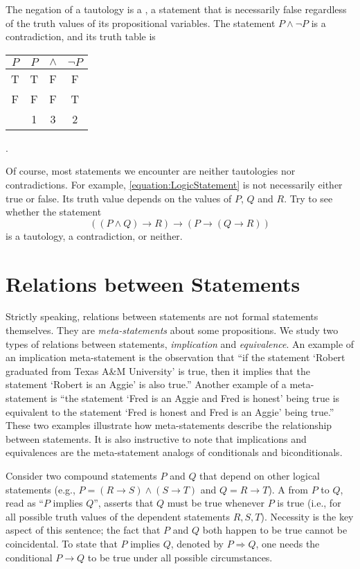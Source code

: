 The negation of a tautology is a , a statement that is necessarily false regardless of the truth values of its propositional variables.
The statement $P \wedge \neg P$ is a contradiction, and its truth table is
\begin{center}
\begin{tabular}{|c|ccc|}
\hline
$P$ & $P$ & $\wedge$ & $\neg P$ \\
\hline
T & T & F & F \\
F & F & F & T \\
& 1 & 3 & 2 \\
\hline
\end{tabular} .
\end{center}

Of course, most statements we encounter are neither tautologies nor contradictions.
For example, \eqref{equation:LogicStatement} is not necessarily either true or false.
Its truth value depends on the values of $P$, $Q$ and $R$.
Try to see whether the statement
\begin{equation*}
((P \wedge Q) \rightarrow R) \rightarrow (P \rightarrow (Q \rightarrow R))
\end{equation*}
is a tautology, a contradiction, or neither.


\section{Relations between Statements}
\label{section:Relations}

Strictly speaking, relations between statements are not formal statements themselves.
They are \emph{meta-statements} about some propositions.
We study two types of relations between statements, \emph{implication} and \emph{equivalence}.
An example of an implication meta-statement is the observation that ``if the statement `Robert graduated from Texas A\&M University' is true, then it implies that the statement `Robert is an Aggie' is also true.''
Another example of a meta-statement is ``the statement `Fred is an Aggie and Fred is honest' being true is equivalent to the statement `Fred is honest and Fred is an Aggie' being true.''
These two examples illustrate how meta-statements describe the relationship between statements.
It is also instructive to note that implications and equivalences are the meta-statement analogs of conditionals and biconditionals.

Consider two compound statements $P$ and $Q$ that depend on other logical statements (e.g., $P = (R \to S) \wedge (S \to T)$ and $Q = R \to T$).
A  from $P$ to $Q$, read as ``$P$ implies $Q$'',  asserts that $Q$ must be true whenever $P$ is true (i.e., for all possible truth values of the dependent statements $R,S,T$).
Necessity is the key aspect of this sentence; the fact that $P$ and $Q$ both happen to be true cannot be coincidental.
To state that $P$ implies $Q$, denoted by $P \Rightarrow Q$, one needs the conditional $P \rightarrow Q$ to be true under all possible circumstances.

